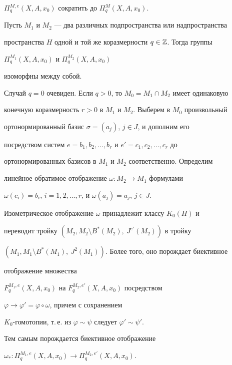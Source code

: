 $\Pi^{M,e}_q(X,A,x_0)$ сократить до $\Pi^{M}_q(X,A,x_0)$. 


 


\begin{prop} 


Пусть $M_1$ и $M_2$ --- два различных подпространства или надпространства 


пространства $H$ одной и той же коразмерности $q\in\Bbb Z$. Тогда группы 


$\Pi^{M_1}_q(X,A,x_0)$ и $\Pi^{M_2}_q(X,A,x_0)$ 


изоморфны между собой. 


\end{prop} 


 


\begin{pf} 


Случай $q=0$ очевиден. Если $q>0$, то $M_0=M_1\cap M_2$ имеет одинаковую 


конечную коразмерность $r>0$ в $M_1$ и $M_2$. Выберем в $M_0$ произвольный 


ортонормированный базис $\sigma=(a_j)$, $j\in J$, и дополним его 


посредством систем $e=b_1,b_2,\dotsc,b_r$ и $e'=c_1,c_2,\dotsc,c_r$ до 


ортонормированных базисов в $M_1$ и $M_2$ соответственно. Определим 


линейное обратимое отображение $\omega:M_2\to M_1$ формулами 


$\omega(c_i)=b_i$, $i=1,2,\dotsc,r$, и $\omega(a_j)=a_j$, $j\in J$. 


Изометрическое отображение $\omega$ принадлежит классу $K_0(H)$ и 


переводит тройку $(M_2,M_2\setminus B^*(M_2),\ J^{e'}(M_2))$ в тройку 


$(M_1,M_1\setminus B^*(M_1),\ J^2(M_1))$. Более того, оно порождает биективное 


отображение множества 


$F^{M_1,e}_q(X,A,x_0)$ на $F^{M_2,e'}_q(X,A,x_0)$ посредством 


$\varphi\to\varphi'=\varphi\circ\omega$, причем с сохранением 


$K_0$-гомотопии, т.\,е. из $\varphi\sim\psi$ следует $\varphi'\sim\psi'$. 


Тем самым порождается биективное отображение 


$\omega_*:\Pi^{M_1,e}_q(X,A,x_0)\to\Pi^{M_2,e'}_q(X,A,x_0)$. 



\end{pf}
